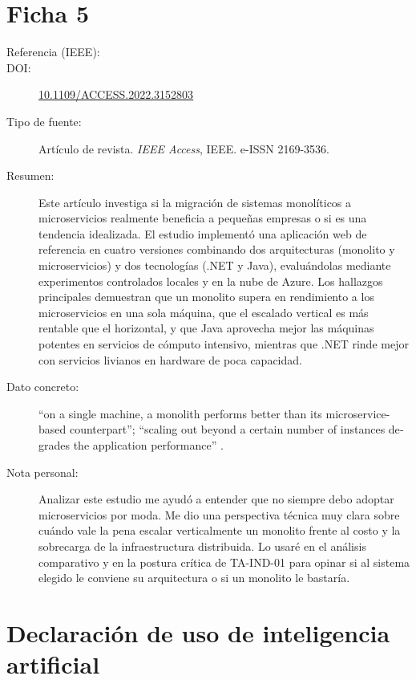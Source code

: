 \documentclass[11pt,a4paper]{article}
\newcommand{\doi}[1]{\href{https://doi.org/#1}{#1}}
\begin{document}
\section{Ficha 5}
\begin{description}
  \item[Referencia (IEEE):] 
  \item[DOI:] \doi{10.1109/ACCESS.2022.3152803}
  \item[Tipo de fuente:] Artículo de revista. \emph{IEEE Access}, IEEE. e-ISSN 2169-3536.
  \item[Resumen:] Este artículo investiga si la migración de sistemas monolíticos a microservicios realmente beneficia a pequeñas empresas o si es una tendencia idealizada. El estudio implementó una aplicación web de referencia en cuatro versiones combinando dos arquitecturas (monolito y microservicios) y dos tecnologías (.NET y Java), evaluándolas mediante experimentos controlados locales y en la nube de Azure. Los hallazgos principales demuestran que un monolito supera en rendimiento a los microservicios en una sola máquina, que el escalado vertical es más rentable que el horizontal, y que Java aprovecha mejor las máquinas potentes en servicios de cómputo intensivo, mientras que .NET rinde mejor con servicios livianos en hardware de poca capacidad.
  \item[Dato concreto:] \foreignquote{american}{on a single machine, a monolith performs better than its microservice-based counterpart}; \foreignquote{american}{scaling out beyond a certain number of instances degrades the application performance} \cite[Sec.~VIII, p.~20372]{blinowski2022}.
  \item[Nota personal:] Analizar este estudio me ayudó a entender que no siempre debo adoptar microservicios por moda. Me dio una perspectiva técnica muy clara sobre cuándo vale la pena escalar verticalmente un monolito frente al costo y la sobrecarga de la infraestructura distribuida. Lo usaré en el análisis comparativo y en la postura crítica de TA-IND-01 para opinar si al sistema elegido le conviene su arquitectura o si un monolito le bastaría.
\end{description}

\section{Declaración de uso de inteligencia artificial}
\end{document}
